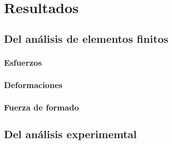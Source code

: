\chapter{Resultados}

\section{Del análisis de elementos finitos}

\subsection{Esfuerzos}

\subsection{Deformaciones}

\subsection{Fuerza de formado}

\section{Del análisis experimemtal}


